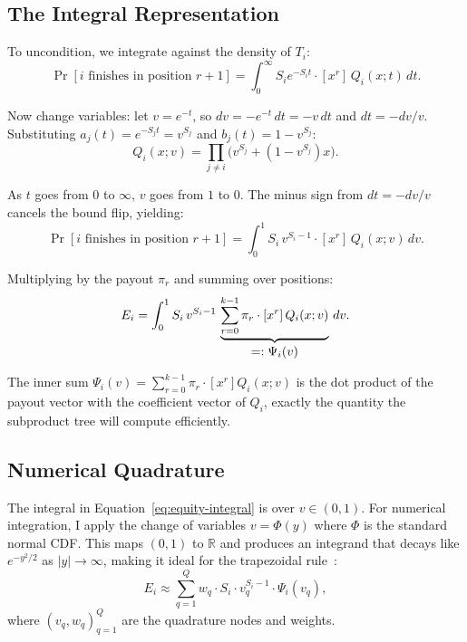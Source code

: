 \documentclass[11pt]{article}
\begin{document}
\subsection{The Integral Representation}

To uncondition, we integrate against the density of $T_i$:
\begin{equation}\label{eq:position-prob}
  \Pr[i \text{ finishes in position } r+1]
  = \int_0^\infty S_i e^{-S_i t} \cdot [x^r]\, Q_i(x; t) \, dt.
\end{equation}

Now change variables: let $v = e^{-t}$, so $dv = -e^{-t}\,dt = -v\,dt$ and
$dt = -dv/v$. Substituting $a_j(t) = e^{-S_j t} = v^{S_j}$ and
$b_j(t) = 1 - v^{S_j}$:
\begin{equation}\label{eq:gf-v}
  Q_i(x; v) = \prod_{j \neq i} \bigl(v^{S_j} + (1 - v^{S_j}) x\bigr).
\end{equation}

As $t$ goes from $0$ to $\infty$, $v$ goes from $1$ to $0$. The minus sign
from $dt = -dv/v$ cancels the bound flip, yielding:
\begin{equation}\label{eq:position-prob-v}
  \Pr[i \text{ finishes in position } r+1]
  = \int_0^1 S_i \, v^{S_i - 1} \cdot [x^r]\, Q_i(x; v) \, dv.
\end{equation}

Multiplying by the payout $\pi_r$ and summing over positions:
\begin{equation}\label{eq:equity-integral}
  E_i = \int_0^1 S_i \, v^{S_i - 1} \,
    \underbrace{\sum_{r=0}^{k-1} \pi_r \cdot [x^r]\, Q_i(x; v)}_{%
      \textstyle =: \Psi_i(v)} \, dv.
\end{equation}

The inner sum $\Psi_i(v) = \sum_{r=0}^{k-1} \pi_r \cdot [x^r] Q_i(x; v)$
is the dot product of the payout vector with the coefficient vector of
$Q_i$, exactly the quantity the subproduct tree will compute efficiently.

\subsection{Numerical Quadrature}

The integral in Equation~\ref{eq:equity-integral} is over $v \in (0, 1)$.
For numerical integration, I apply the change of variables
$v = \Phi(y)$ where $\Phi$ is the standard normal CDF. This maps
$(0, 1)$ to $\mathbb{R}$ and produces an integrand that decays like
$e^{-y^2/2}$ as $|y| \to \infty$, making it ideal for the trapezoidal
rule~\citep{trefethen2014}:
\begin{equation}\label{eq:quadrature}
  E_i \approx \sum_{q=1}^{Q} w_q \cdot S_i \cdot v_q^{S_i - 1}
    \cdot \Psi_i(v_q),
\end{equation}
where $(v_q, w_q)_{q=1}^Q$ are the quadrature nodes and weights.
\end{document}
